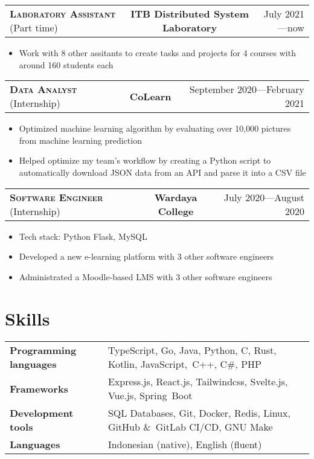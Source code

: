 \documentclass[10pt]{article}
\makeatletter
\newcommand{\workExpVspace}{1em}
\newcommand{\workExp}[6]{
    \noindent \begin{tabularx}{\textwidth}{@{}X c|r}
        \textbf{\textsc{#5}} (#2) & \textbf{#1} & #3---#4
    \end{tabularx}

    {#6}
    \vspace{\workExpVspace}
}
\makeatother
\begin{document}
\workExp
    {ITB Distributed System Laboratory}
    {Part time}
    {July 2021}
    {now}
    {Laboratory Assistant}
    {
        \begin{itemize}
            \item Work with 8 other assitants to create tasks and projects for 4 courses with
                around 160 students each
        \end{itemize}
    }

\workExp
    {CoLearn}
    {Internship}
    {September 2020}
    {February 2021}
    {Data Analyst}
    {
        \begin{itemize}
            \item Optimized machine learning algorithm by evaluating over 10,000 pictures from
                machine learning prediction
            \item Helped optimize my team's workflow by creating a Python script to automatically
                download JSON data from an API and parse it into a CSV file
        \end{itemize}
    }

\workExp
    {Wardaya College}
    {Internship}
    {July 2020}
    {August 2020}
    {Software Engineer}
    {
        \begin{itemize}
            \item Tech stack: Python Flask, MySQL
            \item Developed a new e-learning platform with 3 other software engineers
            \item Administrated a Moodle-based LMS with 3 other software engineers
        \end{itemize}
    }

\section{Skills}

\begin{tabularx}{\textwidth}{@{}X l}
\textbf{Programming languages} & TypeScript, Go, Java, Python, C, Rust, Kotlin, JavaScript,\
                                 C++, C\#, PHP \\
\textbf{Frameworks}            & Express.js, React.js, Tailwindcss, Svelte.js, Vue.js, Spring\
                                 Boot \\
\textbf{Development tools}     & SQL Databases, Git, Docker, Redis, Linux, GitHub \&\
                                 GitLab CI/CD, GNU Make \\
\textbf{Languages}             & Indonesian (native), English (fluent)
\end{tabularx}
\end{document}
